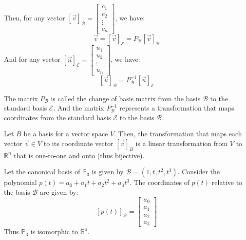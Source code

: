 Then, for any vector $[\vec{v}]_{\mathcal{B}} = \begin{bmatrix}
    c_1 \\ c_2 \\ \vdots \\ c_n
\end{bmatrix}$, we have:
\[ \vec{v} = [\vec{v}]_{\mathcal{E}} = P_{\mathcal{B}} [\vec{v}]_{\mathcal{B}} \]
And for any vector $[\vec{u}]_{\mathcal{E}} = \begin{bmatrix}
    u_1 \\ u_2 \\ \vdots \\ u_n
\end{bmatrix}$, we have:
\[ [\vec{u}]_{\mathcal{B}} = P_{\mathcal{B}}^{-1} [\vec{u}]_{\mathcal{E}} \]
\begin{definition}
    The matrix $P_{\mathcal{B}}$ is called the change of basis matrix from the basis $\mathcal{B}$ to the standard basis $\mathcal{E}$. And the matrix $P_{\mathcal{B}}^{-1}$ represents a transformation that maps coordinates from the standard basis $\mathcal{E}$ to the basis $\mathcal{B}$.
\end{definition}

\begin{theorem}
    Let $B$ be a basis for a vector space $V$. Then, the transformation that maps each vector $\vec{v} \in V$ to its coordinate vector $[\vec{v}]_B$ is a linear transformation from $V$ to $\mathbb{R}^n$ that is one-to-one and onto (thus bijective).
\end{theorem}

\begin{eg}
    Let the canonical basis of $\mathbb{P}_3$ is given by $\mathcal{B} = (1, t, t^2, t^3)$. Consider the polynomial $p(t) = a_0 + a_1 t + a_2 t^2 + a_3 t^3$. The coordinates of $p(t)$ relative to the basis $\mathcal{B}$ are given by:
    \[ [p(t)]_{\mathcal{B}} = \begin{bmatrix}
        a_0 \\ a_1 \\ a_2 \\ a_3
    \end{bmatrix} \]
    Thus $\mathbb{P}_3$ is isomorphic to $\mathbb{R}^4$.
\end{eg}

